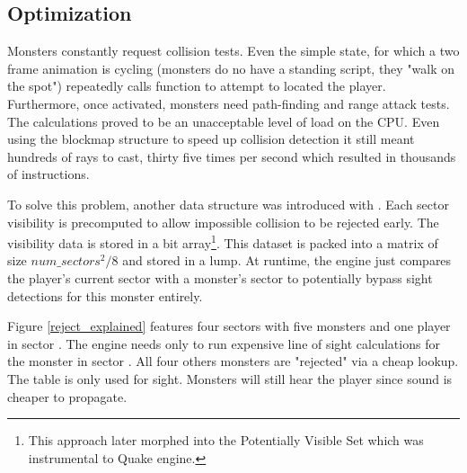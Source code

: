 \subsection{Optimization}
Monsters constantly request collision tests. Even the simple  state, for which a two frame animation is cycling (monsters do no have a standing script, they "walk on the spot") repeatedly calls  function to attempt to located the player. Furthermore, once activated, monsters need path-finding and range attack tests. The calculations proved to be an unacceptable level of load on the CPU. Even using the blockmap structure to speed up collision detection it still meant hundreds of rays to cast, thirty five times per second which resulted in thousands of instructions.\\
\par
To solve this problem, another data structure was introduced with . Each sector visibility is precomputed to allow impossible collision to be rejected early. The visibility data is stored in a bit array\footnote{This approach later morphed into the Potentially Visible Set which was instrumental to Quake engine.}. This dataset is packed into a matrix of size $num\_sectors^2/8$ and stored in a  lump. At runtime, the engine just compares the player's current sector with a monster's sector to potentially bypass sight detections for this monster entirely.\\
\par
{}
\vspace{-7pt}
Figure \ref{reject_explained} features four sectors with five monsters and one player in sector . The engine needs only to run expensive line of sight calculations for the monster in sector . All four others monsters are "rejected" via a cheap lookup. The table is only used for sight. Monsters will still hear the player since sound is cheaper to propagate.\\
\par
{}






